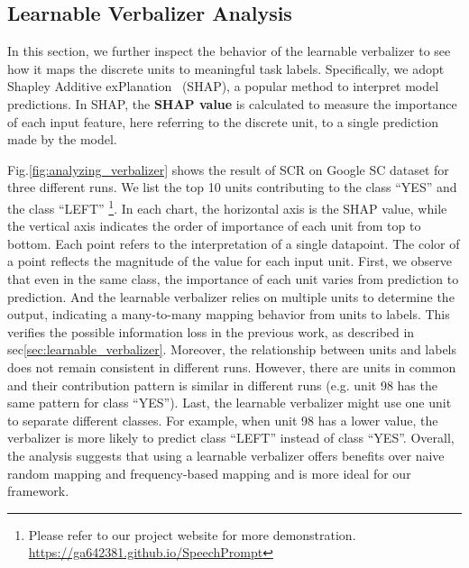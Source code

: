 \vspace{-0.5em}
\subsection{Learnable Verbalizer Analysis}
In this section, we further inspect the behavior of the learnable verbalizer to see how it maps the discrete units to meaningful task labels. Specifically, we adopt Shapley Additive exPlanation~\cite{lundberg2017unified} (SHAP), a popular method to interpret model predictions. In SHAP, the \textbf{SHAP value} is calculated to measure the importance of each input feature, here referring to the discrete unit, to a single prediction made by the model. 

Fig.\ref{fig:analyzing_verbalizer} shows the result of SCR on Google SC dataset for three different runs. We list the top 10 units contributing to the class ``YES'' and the class ``LEFT'' 
\footnote{Please refer to our project website for more demonstration. \url{https://ga642381.github.io/SpeechPrompt}}.
In each chart, the horizontal axis is the SHAP value, while the vertical axis indicates the order of importance of each unit from top to bottom. 
Each point refers to the interpretation of a single datapoint. The color of a point reflects the magnitude of the value for each input unit.
First, we observe that even in the same class, the importance of each unit varies from prediction to prediction. And the learnable verbalizer relies on multiple units to determine the output, indicating a many-to-many mapping behavior from units to labels. This verifies the possible information loss in the previous work, as described in sec\ref{sec:learnable_verbalizer}.
Moreover, the relationship between units and labels does not remain consistent in different runs. 
However, there are units in common and their contribution pattern is similar in different runs (e.g. unit 98 has the same pattern for class ``YES'').
Last, the learnable verbalizer might use one unit to separate different classes. For example, when unit 98 has a lower value, the verbalizer is more likely to predict class ``LEFT'' instead of class ``YES''.
Overall, the analysis suggests that using a learnable verbalizer offers benefits over naive random mapping and frequency-based mapping and is more ideal for our framework. 




























